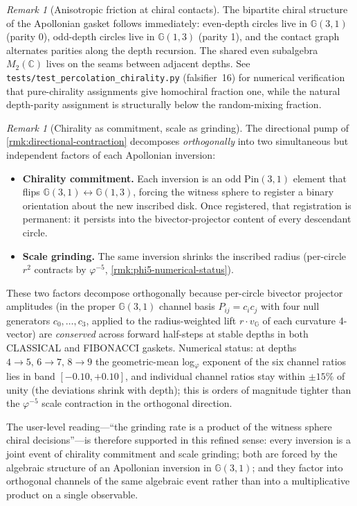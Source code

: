 \documentclass[11pt,a4paper]{article}
\theoremstyle{plain}
\theoremstyle{definition}
\theoremstyle{remark}
\newtheorem{remark}[theorem]{Remark}
\numberwithin{equation}{section}
\newcommand{\Cl}{\mathbb{G}}
\newcommand{\vp}{\varphi}
\begin{document}
\begin{remark}[Anisotropic friction at chiral contacts]
The bipartite chiral structure of the Apollonian gasket follows
immediately: even-depth circles live in \(\Cl(3,1)\) (parity 0),
odd-depth circles live in \(\Cl(1,3)\) (parity 1), and the contact
graph alternates parities along the depth recursion.  The shared
even subalgebra \(M_2(\mathbb{C})\) lives on the seams between
adjacent depths.  See \texttt{tests/test\_percolation\_chirality.py}
(falsifier~16) for numerical verification that pure-chirality
assignments give homochiral fraction one, while the natural
depth-parity assignment is structurally below the random-mixing
fraction.
\end{remark}

\begin{remark}[Chirality as commitment, scale as grinding]
\label{rmk:chiral-decision-mechanism}
The directional pump of \cref{rmk:directional-contraction}
decomposes \emph{orthogonally} into two simultaneous but independent
factors of each Apollonian inversion:

\begin{itemize}
\item[(i)] \textbf{Chirality commitment.}  Each inversion is an odd
  Pin\((3,1)\) element that flips \(\Cl(3,1) \leftrightarrow
  \Cl(1,3)\), forcing the witness sphere to register a binary
  orientation about the new inscribed disk.  Once registered, that
  registration is permanent: it persists into the bivector-projector
  content of every descendant circle.
\item[(ii)] \textbf{Scale grinding.}  The same inversion shrinks the
  inscribed radius (per-circle \(r^{2}\) contracts by \(\vp^{-5}\),
  \cref{rmk:phi5-numerical-status}).
\end{itemize}

These two factors decompose orthogonally because per-circle
bivector projector amplitudes (in the proper \(\Cl(3,1)\) channel
basis \(P_{ij} = c_i c_j\) with four null generators \(c_0,\dots,c_3\),
applied to the radius-weighted lift \(r \cdot v_{\Cl}\) of each
curvature 4-vector) are \emph{conserved} across forward half-steps
at stable depths in both CLASSICAL and FIBONACCI gaskets.  Numerical
status: at depths \(4{\to}5,\,6{\to}7,\,8{\to}9\) the
geometric-mean log\(_{\vp}\) exponent of the six channel ratios
lies in band \([-0.10,+0.10]\), and individual channel ratios stay
within \(\pm 15\%\) of unity (the deviations shrink with depth);
this is orders of magnitude tighter than the \(\vp^{-5}\) scale
contraction in the orthogonal direction.

The user-level reading---``the grinding rate is a product of the
witness sphere chiral decisions''---is therefore supported in this
refined sense: every inversion is a joint event of chirality
commitment and scale grinding; both are forced by the algebraic
structure of an Apollonian inversion in \(\Cl(3,1)\); and they
factor into orthogonal channels of the same algebraic event rather
than into a multiplicative product on a single observable.


\end{remark}
\end{document}
